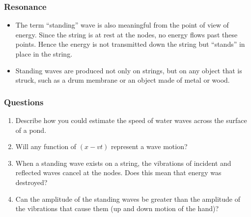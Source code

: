 \documentclass[]{beamer}
\begin{document}

\begin{frame}
\frametitle{Resonance}


\begin{itemize}
  \item  The term “standing” wave is also meaningful from the point of view
  of energy. Since the string is at rest at the nodes, no energy flows past these points.
  Hence the energy is not transmitted down the string but “stands” in place in the string.\pause
  \item Standing waves are produced not only on strings, but on any object that is
  struck, such as a drum membrane or an object made of metal or wood.
  
\end{itemize}






  \end{frame}






\begin{frame}
\frametitle{Questions}

\begin{enumerate}

\item Describe how you could estimate the speed of water waves
across the surface of a pond.
\pause
\item Will any function of $(x- v t)$ represent a
wave motion?
\pause


\item When a standing wave exists on a string, the vibrations of
incident and reflected waves cancel at the nodes. Does this
mean that energy was destroyed? 

\pause

\item Can the amplitude of the standing waves  be
greater than the amplitude of the vibrations that cause them
(up and down motion of the hand)?


\end{enumerate}

  \end{frame}
































 
\end{document}
